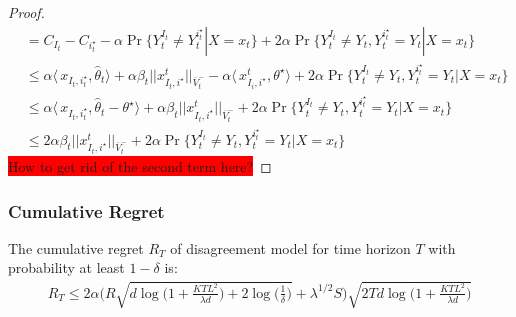 \begin{proof}
\begin{align*}
&=C_{I_t} - C_{i^\star_t} - \alpha\Pr\{Y^{I_t}_t \neq Y^{i^\star_t}_t| X=x_t\} + 2\alpha\Pr\{Y_{t}^{I_t} \neq Y_t,Y^{ i^\star_t}_t =Y_t| X=x_t \}\\
& \le \alpha \langle\,x_{I_t,i^\star_t},\widehat{\theta}_t\rangle + \alpha \beta_t||x_{I_t, i^\star}^t||_{\overline{V}^-_t} -\alpha\langle\,x_{I_i,i^\star}^t, \theta^\star\rangle + 2\alpha\Pr\{Y_{t}^{I_t} \neq Y_t,Y^{ i^\star_t}_t =Y_t| X=x_t \}\\
& \le \alpha \langle\,x_{I_t,i^\star_t},\widehat{\theta}_t-\theta^\star\rangle + \alpha \beta_t||x_{I_t, i^\star}^t||_{\overline{V}^-_t} + 2\alpha\Pr\{Y_{t}^{I_t} \neq Y_t,Y^{ i^\star_t}_t =Y_t| X=x_t \}\\
& \le 2\alpha \beta_t||x_{I_t, i^\star}^t||_{\overline{V}^-_t} + 2\alpha\Pr\{Y_{t}^{I_t} \neq Y_t,Y^{ i^\star_t}_t =Y_t| X=x_t \}
\end{align*}
	\colorbox{red}{
		How to get rid of the second term here?}
\end{proof}


\subsubsection{Cumulative Regret}
\label{sec:ra_cr}
\begin{theorem}
	\label{thm:cr}
	The cumulative regret $R_T$ of disagreement model for time horizon $T$ with probability at least $1-\delta$ is:
	\begin{align*}
	R_T \le 2\alpha \bigg( R\sqrt{d\log\bigg(1 + \frac{KTL^2}{\lambda d}\bigg) + 2\log\bigg(\frac{1}{\delta}\bigg)} + \lambda^{1/2}S\bigg) \sqrt{2Td\log\bigg(1 + \frac{KTL^2}{\lambda d}\bigg)}
	\end{align*}
\end{theorem}


